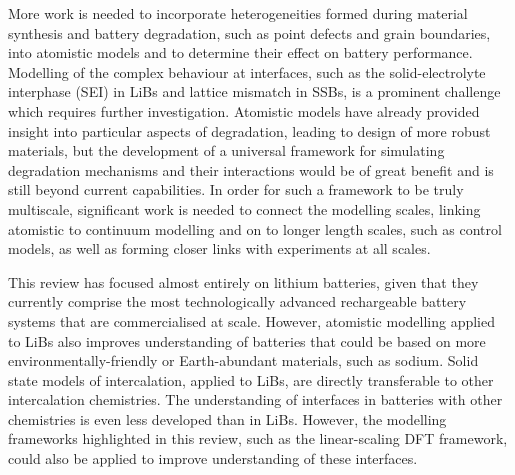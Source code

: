 \documentclass[../main.tex]{subfiles}
\begin{document}
More work is needed to incorporate heterogeneities formed during material synthesis and battery degradation,\cite{Edge2021,Birkl2017} such as point defects \cite{mercer_influence_2017,schlueter_quantifying_2018,squires_2020,Swift2021,hoang2016defect} and grain boundaries,\cite{dean2021overscreening,Kim2020,symington2021elucidating} into atomistic models and to determine their effect on battery performance. Modelling of the complex behaviour at interfaces, such as the solid-electrolyte interphase (SEI) in LiBs and lattice mismatch in SSBs, is a prominent challenge which requires further investigation. Atomistic models have already provided insight into particular aspects of degradation, leading to design of more robust materials, but the development of a universal framework for simulating degradation mechanisms and their interactions would be of great benefit and is still beyond current capabilities. In order for such a framework to be truly multiscale, significant work is needed to connect the modelling scales, linking atomistic to continuum modelling and on to longer length scales, such as control models, as well as forming closer links with experiments at all scales.

This review has focused almost entirely on lithium batteries, given that they currently comprise the most technologically advanced rechargeable battery systems that are commercialised at scale. However, atomistic modelling applied to LiBs also improves understanding of batteries that could be based on more environmentally-friendly or Earth-abundant materials, such as sodium. Solid state models of intercalation, applied to LiBs, are directly transferable to other intercalation chemistries. The understanding of interfaces in batteries with other chemistries is even less developed than in LiBs. However, the modelling frameworks highlighted in this review, such as the linear-scaling DFT framework, could also be applied to improve understanding of these interfaces.
\end{document}
